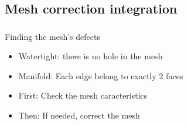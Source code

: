 \documentclass{beamer}
\begin{document}
\subsection{Mesh correction integration}

\begin{frame}
	\frametitle{}

    \begin{block}{Finding the mesh's defects}
		\begin{itemize}
		    \item Watertight: there is no hole in the mesh
            \item Manifold: Each edge belong to exactly 2 faces
		    \item First: Check the mesh caracteristics
			\item Then: If needed, correct the mesh
		\end{itemize}
    \end{block}

\end{frame}
\end{document}
